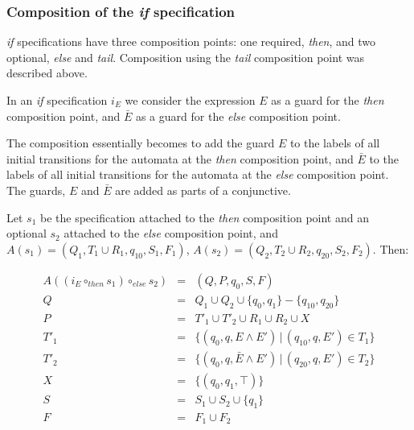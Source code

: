 \documentclass[a4paper,11pt]{kth-mag}
\theoremstyle{definition}
\begin{document}
\subsubsection{Composition of the \textit{if} specification}

\textit{if} specifications have three composition points: one required,
\textit{then}, and two optional, \textit{else} and \textit{tail}. Composition
using the \textit{tail} composition point was described above.

In an \textit{if} specification $i_E$ we consider the expression $E$ as a guard
for the \textit{then} composition point, and $\bar{E}$ as a guard for the
\textit{else} composition point.

The composition essentially becomes to add the guard $E$ to the labels of all
initial transitions for the automata at the \textit{then} composition point,
and $\bar{E}$ to the labels of all initial transitions for the automata at the
\textit{else} composition point. The guards, $E$ and $\bar{E}$ are added as
parts of a conjunctive.

Let $s_1$ be the specification attached to the \textit{then} composition point
and an optional $s_2$ attached to the \textit{else} composition point, and
$A(s_1) = (Q_1, T_1 \cup R_1, q_{10}, S_1, F_1)$, $A(s_2) = (Q_2, T_2 \cup R_2,
q_{20}, S_2, F_2)$. Then:

\medskip
\[
  \begin{array}{rcl}
  A((i_E \circ_{then} s_1) \circ_{else} s_2) & = & (Q, P, q_0, S, F) \\
                                           Q & = & Q_1 \cup Q_2 \cup \{q_0, q_1\} - \{q_{10}, q_{20}\} \\
                                           P & = & T'_1 \cup T'_2 \cup R_1 \cup R_2 \cup X \\
                                        T'_1 & = & \{(q_0, q, E       \wedge E') \, | \, (q_{10}, q, E') \in T_1\} \\
                                        T'_2 & = & \{(q_0, q, \bar{E} \wedge E') \, | \, (q_{20}, q, E') \in T_2\} \\
                                           X & = & \{(q_0, q_1, \top)\} \\
                                           S & = & S_1 \cup S_2 \cup \{q_1\} \\
                                           F & = & F_1 \cup F_2
  \end{array}
\]
\medskip
\end{document}
